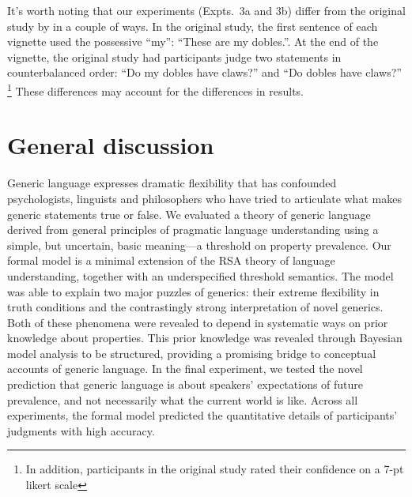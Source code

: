\documentclass[12pt,letterpaper]{article}
\begin{document}
It's worth noting that our experiments (Expts.~3a and 3b) differ from the original study by \citeauthor{Gelman2007} in a couple of ways.
In the original study, the first sentence of each vignette used the possessive ``my'': ``These are my dobles.''.
At the end of the vignette, the original study had participants judge two statements in counterbalanced order: ``Do my dobles have claws?'' and ``Do dobles have claws?'' \footnote{In addition, participants in the original study rated their confidence on a 7-pt likert scale}
These differences may account for the differences in results.

\section*{General discussion}

Generic language expresses dramatic flexibility that has confounded psychologists, linguists and philosophers who have tried to articulate what makes generic statements true or false. 
We evaluated a theory of generic language derived from general principles of pragmatic language understanding using a simple, but uncertain, basic meaning---a threshold on property prevalence.
Our formal model is a minimal extension of the RSA theory of language understanding, together with an underspecified threshold semantics.
The model was able to explain two major puzzles of generics: their extreme flexibility in truth conditions and the contrastingly strong interpretation of novel generics.
Both of these phenomena were revealed to depend in systematic ways on prior knowledge about properties.
This prior knowledge was revealed through Bayesian model analysis to be structured, providing a promising bridge to conceptual accounts of generic language.
In the final experiment, we tested the novel prediction that generic language is about speakers' expectations of future prevalence, and not necessarily what the current world is like. 
Across all experiments, the formal model predicted the quantitative details of participants' judgments with high accuracy.

\end{document}
